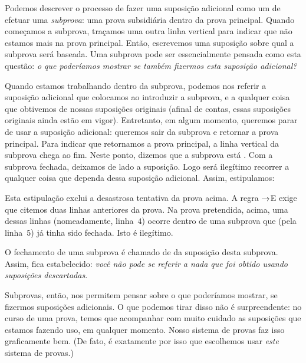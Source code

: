Podemos descrever o processo de fazer uma suposi\c c\~ao adicional como um de efetuar  uma \emph{subprova}: uma prova subsidi\'aria dentro da prova principal. Quando come\c camos a subprova, tra\c camos uma outra linha vertical para indicar que n\~ao estamos mais na prova principal. Ent\~ao, escrevemos uma suposi\c c\~ao sobre qual a subprova ser\'a baseada.  Uma subprova pode ser essencialmente pensada como esta quest\~ao: \emph{o que poder\'iamos mostrar se tamb\'em fizermos esta suposi\c c\~ao adicional?}

Quando estamos trabalhando dentro da subprova, podemos nos referir a suposi\c c\~ao adicional que colocamos ao introduzir a subprova,  e a qualquer coisa que obtivemos de nossas suposi\c c\~oes originais (afinal de contas, essas suposi\c c\~oes originais ainda est\~ao em vigor). Entretanto, em algum momento,  queremos parar de usar a suposi\c c\~ao adicional: queremos sair da subprova e retornar a prova principal. Para indicar que retornamos a prova principal, a linha vertical da subprova chega ao fim.  Neste ponto, dizemos que a subprova est\'a . Com a subprova fechada, deixamos de lado a suposi\c c\~ao.  Logo ser\'a ileg\'itimo recorrer a qualquer coisa que dependa dessa suposi\c c\~ao adicional. Assim, estipulamos:


Esta estipula\c c\~ao exclui a desastrosa tentativa da prova acima. A regra $\rightarrow$E exige que citemos duas linhas anteriores da prova. Na prova pretendida, acima, uma dessas linhas (nomeadamente, linha~$4$)  ocorre dentro de uma subprova que (pela linha~$5$) j\'a tinha sido fechada. Isto \'e ileg\'itimo. 

O fechamento de uma subprova \'e chamado de  da suposi\c c\~ao desta subprova. Assim, fica estabelecido: \emph{voc\^e n\~ao pode se referir a nada que foi obtido usando suposi\c c\~oes descartadas}. 

Subprovas, ent\~ao, nos permitem pensar sobre o que poder\'iamos mostrar,  se fizermos suposi\c c\~oes adicionais.  O que podemos  tirar disso n\~ao \'e surpreendente: no curso de uma prova, temos que acompanhar com muito cuidado as suposi\c c\~oes que estamos fazendo uso, em qualquer momento.  Nosso sistema de provas faz isso graficamente bem. (De fato, \'e exatamente por isso que escolhemos usar  \emph{este}  sistema de provas.)

